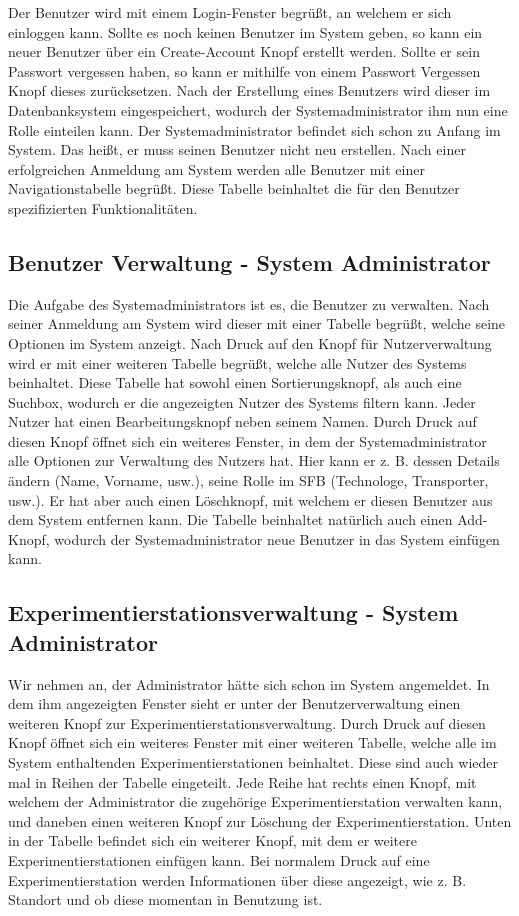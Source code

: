 \documentclass[enabledeprecatedfontcommands,fontsize=12pt,paper=a4,twoside]{scrartcl}
\begin{document}
Der Benutzer wird mit einem Login-Fenster begrüßt, an welchem er sich einloggen kann. Sollte es noch keinen Benutzer im System geben, so kann ein neuer Benutzer über ein Create-Account Knopf erstellt werden. Sollte er sein Passwort vergessen haben, so kann er mithilfe von einem Passwort Vergessen Knopf dieses zurücksetzen.
Nach der Erstellung eines Benutzers wird dieser im Datenbanksystem eingespeichert, wodurch der Systemadministrator ihm nun eine Rolle einteilen kann.
Der Systemadministrator befindet sich schon zu Anfang im System. Das heißt, er muss seinen Benutzer nicht neu erstellen.
Nach einer erfolgreichen Anmeldung am System werden alle Benutzer mit einer Navigationstabelle begrüßt. Diese Tabelle beinhaltet die für den Benutzer spezifizierten Funktionalitäten.

\subsection{Benutzer Verwaltung - System Administrator}

Die Aufgabe des Systemadministrators ist es, die Benutzer zu verwalten. Nach seiner Anmeldung am System wird dieser mit einer Tabelle begrüßt, welche seine Optionen im System anzeigt. Nach Druck auf den Knopf für Nutzerverwaltung wird er mit einer weiteren Tabelle begrüßt, welche alle Nutzer des Systems beinhaltet. Diese Tabelle hat sowohl einen Sortierungsknopf, als auch eine Suchbox, wodurch er die angezeigten Nutzer des Systems filtern kann.
Jeder Nutzer hat einen Bearbeitungsknopf neben seinem Namen. Durch Druck auf diesen Knopf öffnet sich ein weiteres Fenster, in dem der Systemadministrator alle Optionen zur Verwaltung des Nutzers hat. Hier kann er z. B. dessen Details ändern (Name, Vorname, usw.), seine Rolle im SFB (Technologe, Transporter, usw.). Er hat aber auch einen Löschknopf, mit welchem er diesen Benutzer aus dem System entfernen kann. 
Die Tabelle beinhaltet natürlich auch einen Add-Knopf, wodurch der Systemadministrator neue Benutzer in das System einfügen kann. 

\subsection{Experimentierstationsverwaltung - System Administrator}

Wir nehmen an, der Administrator hätte sich schon im System angemeldet. In dem ihm angezeigten Fenster sieht er unter der Benutzerverwaltung einen weiteren Knopf zur Experimentierstationsverwaltung. Durch Druck auf diesen Knopf öffnet sich ein weiteres Fenster mit einer weiteren Tabelle, welche alle im System enthaltenden Experimentierstationen beinhaltet. Diese sind auch wieder mal in Reihen der Tabelle eingeteilt. Jede Reihe hat rechts einen Knopf, mit welchem der Administrator die zugehörige Experimentierstation verwalten kann, und daneben einen weiteren Knopf zur Löschung der Experimentierstation.
Unten in der Tabelle befindet sich ein weiterer Knopf, mit dem er weitere Experimentierstationen einfügen kann.
Bei normalem Druck auf eine Experimentierstation werden Informationen über diese angezeigt, wie z. B. Standort und ob diese momentan in Benutzung ist. 
  
\end{document}
